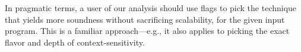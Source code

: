 


In pragmatic terms, a user of our analysis should use flags to pick
the technique that yields more soundness without sacrificing
scalability, for the given input program. This is a familiar
approach---e.g., it also applies to picking the exact flavor and depth
of context-sensitivity.









